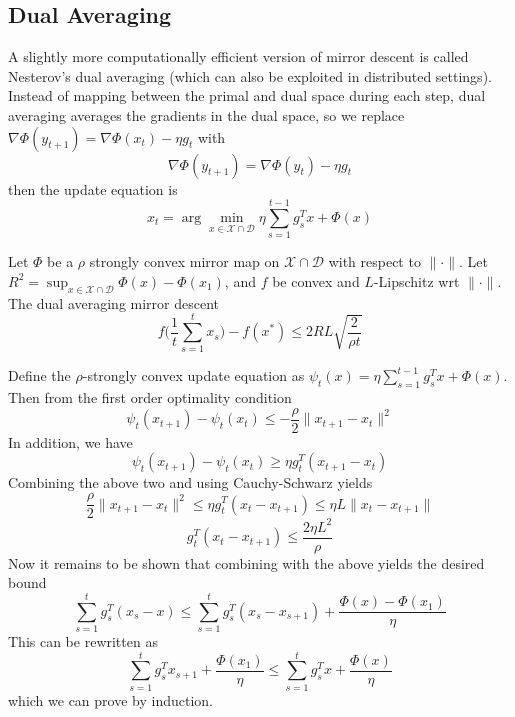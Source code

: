 \subsection{Dual Averaging}
A slightly more computationally efficient version of mirror descent is called Nesterov's dual averaging (which can also be exploited in distributed settings). Instead of mapping between the primal and dual space during each step, dual averaging averages the gradients in the dual space, so we replace $\nabla \Phi(y_{t+1}) = \nabla \Phi(x_t) - \eta g_t$ with
$$\nabla \Phi(y_{t+1}) = \nabla \Phi(y_t) - \eta g_t$$
then the update equation is
$$x_t = \arg\min_{x \in \mathcal{X} \cap \mathcal{D}} \eta \sum_{s=1}^{t-1}g_s^Tx + \Phi(x)$$
\begin{theorem}
Let $\Phi$ be a $\rho$ strongly convex mirror map on $\mathcal{X} \cap \mathcal{D}$ with respect to $\|\cdot \|$. Let $R^2 = \sup_{x \in \mathcal{X} \cap \mathcal{D}} \Phi(x) - \Phi(x_1)$, and $f$ be convex and $L$-Lipschitz wrt $\|\cdot\|$. The dual averaging mirror descent 
$$f\Big(\frac{1}{t}\sum_{s=1}^t x_s \Big) - f(x^*) \leq 2RL \sqrt{\frac{2}{\rho t}}$$
\end{theorem}
\proofstart Define the $\rho$-strongly convex update equation as $\psi_t(x) = \eta\sum_{s=1}^{t-1}g_s^Tx + \Phi(x)$. Then from the first order optimality condition
$$\psi_t(x_{t+1}) - \psi_t(x_t) \leq -\frac{\rho}{2}\|x_{t+1} - x_t\|^2$$
In addition, we have
$$\psi_t(x_{t+1}) - \psi_t(x_t) \geq \eta g_t^T(x_{t+1} - x_t)$$
Combining the above two and using Cauchy-Schwarz yields
$$\frac{\rho}{2}\|x_{t+1} - x_t\|^2 \leq \eta g_t^T(x_{t} - x_{t+1}) \leq \eta L \|x_{t} - x_{t+1}\|$$
$$g_t^T(x_{t} - x_{t+1}) \leq \frac{2\eta L^2}{\rho}$$
Now it remains to be shown that combining with the above yields the desired bound 
$$\sum_{s=1}^{t}g_s^T(x_s - x) \leq \sum_{s=1}^{t}g_s^T(x_{s} - x_{s+1}) + \frac{\Phi(x) - \Phi(x_1)}{\eta}$$
This can be rewritten as
$$\sum_{s=1}^{t}g_s^Tx_{s+1} + \frac{\Phi(x_1)}{\eta} \leq \sum_{s=1}^tg_s^Tx + \frac{\Phi(x)}{\eta}$$
which we can prove by induction. 
\proofend

